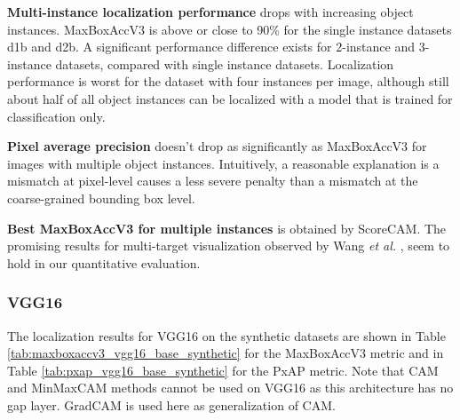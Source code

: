 \textbf{Multi-instance localization performance} drops with increasing object instances. MaxBoxAccV3 is above or close to 90\% for the single instance datasets d1b and d2b. A significant performance difference exists for 2-instance and 3-instance datasets, compared with single instance datasets. Localization performance is worst for the dataset with four instances per image, although still about half of all object instances can be localized with a model that is trained for classification only.

\textbf{Pixel average precision} doesn't drop as significantly as MaxBoxAccV3 for images with multiple object instances. Intuitively, a reasonable explanation is a mismatch at pixel-level causes a less severe penalty than a mismatch at the coarse-grained bounding box level.

\textbf{Best MaxBoxAccV3 for multiple instances} is obtained by ScoreCAM. The promising results for multi-target visualization observed by Wang \textit{et al.} \cite{wang2020score}, seem to hold in our quantitative evaluation.

\subsubsection{VGG16}
The localization results for VGG16 on the synthetic datasets are shown in Table \ref{tab:maxboxaccv3_vgg16_base_synthetic} for the MaxBoxAccV3 metric and in Table \ref{tab:pxap_vgg16_base_synthetic} for the PxAP metric. Note that CAM and MinMaxCAM methods cannot be used on VGG16 as this architecture has no \acrshort{gap} layer. GradCAM is used here as generalization of CAM.

